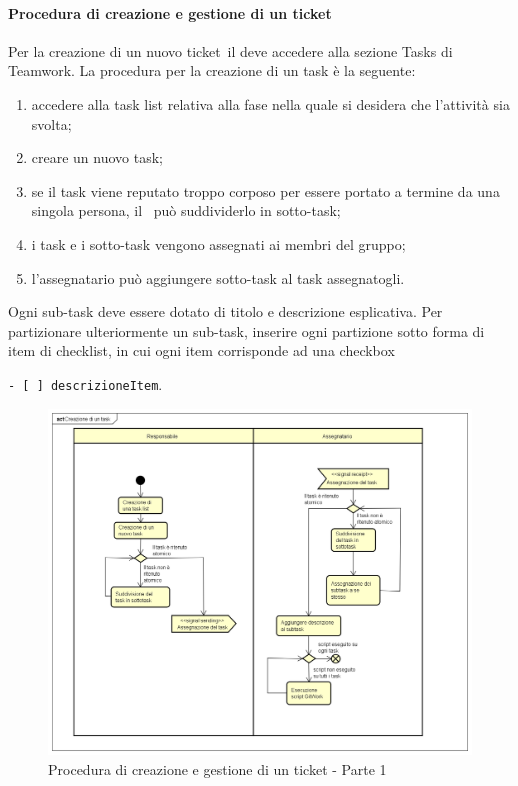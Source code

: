\documentclass[../NormeProgetto.tex]{subfiles}
\begin{document}
			\paragraph{Procedura di creazione e gestione di un ticket}
				Per la creazione di un nuovo ticket\g\ il \responsabilediprogetto deve accedere alla sezione Tasks di Teamwork\g. La procedura per la creazione di un task è la seguente:
				\begin{enumerate}
					\item accedere alla task list relativa alla fase nella quale si desidera che l'attività sia svolta;
					\item creare un nuovo task;
					\item se il task viene reputato troppo corposo per essere portato a termine da una singola persona, il \responsabilediprogetto\ può suddividerlo in sotto-task;
					\item i task e i sotto-task vengono assegnati ai membri del gruppo;
					\item l'assegnatario può aggiungere sotto-task al task assegnatogli. 
				\end{enumerate}
				Ogni sub-task deve essere dotato di titolo e descrizione esplicativa. Per partizionare ulteriormente un sub-task, inserire ogni partizione sotto forma di item di checklist, in cui ogni item corrisponde ad una checkbox \begin{center}\texttt{- [ ] descrizioneItem}.\end{center}
				\begin{figure}[H]
					\centering
					\includegraphics[scale=0.55]{sections/img/creazioneTask.png}
					\caption{Procedura di creazione e gestione di un ticket - Parte 1}\label{fig:Procedura di creazione e gestione di un ticket - Parte 1} 
				\end{figure}
\end{document}
